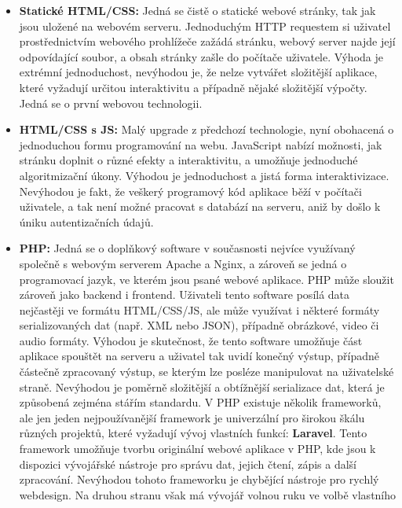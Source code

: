 \begin{itemize}
    \item \textbf{Statické HTML/CSS:} Jedná se čistě o statické webové
        stránky, tak jak jsou uložené na webovém serveru. Jednoduchým
        HTTP requestem si uživatel prostřednictvím webového prohlížeče
        zažádá stránku, webový server najde její odpovídající soubor,
        a obsah stránky zašle do počítače uživatele. Výhoda je extrémní
        jednoduchost, nevýhodou je, že nelze vytvářet složitější aplikace,
        které vyžadují určitou interaktivitu a případně nějaké složitější
        výpočty. Jedná se o první webovou technologii.
    \item \textbf{HTML/CSS s JS:} Malý upgrade z předchozí technologie,
        nyní obohacená o jednoduchou formu programování na webu. JavaScript
        nabízí možnosti, jak stránku doplnit o různé efekty a interaktivitu,
        a umožňuje jednoduché algoritmizační úkony. Výhodou je jednoduchost
        a jistá forma interaktivizace. Nevýhodou je fakt, že veškerý programový
        kód aplikace běží v počítači uživatele, a tak není možné pracovat
        s databází na serveru, aniž by došlo k úniku autentizačních údajů.
    \item \textbf{PHP:} Jedná se o doplňkový software v současnosti nejvíce
        využívaný společně s webovým serverem Apache a Nginx, a zároveň
        se jedná o programovací jazyk, ve kterém jsou psané webové aplikace.
        PHP může sloužit zároveň jako backend i frontend. Uživateli tento
        software posílá data nejčastěji ve formátu HTML/CSS/JS, ale může
        využívat i některé formáty serializovaných dat (např. XML nebo JSON),
        případně obrázkové, video či audio formáty. Výhodou je skutečnost,
        že tento software umožňuje část aplikace spouštět na serveru
        a uživatel tak uvidí konečný výstup, případně částečně zpracovaný
        výstup, se kterým lze posléze manipulovat na uživatelské straně.
        Nevýhodou je poměrně složitější a obtížnější serializace dat, která
        je způsobená zejména stářím standardu. V PHP existuje několik
        frameworků, ale jen jeden nejpoužívanější framework je univerzální
        pro širokou škálu různých projektů, které vyžadují vývoj vlastních
        funkcí: \textbf{Laravel}. Tento framework umožňuje tvorbu originální
        webové aplikace v PHP, kde jsou k dispozici vývojářské nástroje
        pro správu dat, jejich čtení, zápis a další zpracování. Nevýhodou
        tohoto frameworku je chybějící nástroje pro rychlý webdesign.
        Na druhou stranu však má vývojář volnou ruku ve volbě vlastního

\end{itemize}

